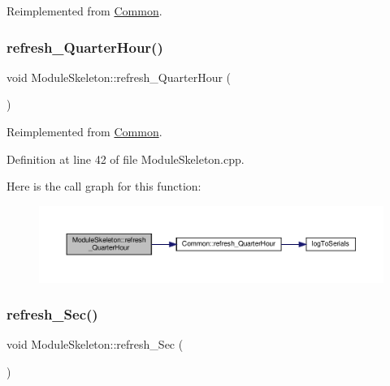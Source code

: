 Reimplemented from \hyperlink{class_common_aa7222229739c89d441fadd6a40deff89}{Common}.

\mbox{\label{class_module_skeleton_ade7e1fee2417a8e23a1f8f31502045ab}} 
\subsubsection{\texorpdfstring{refresh\+\_\+\+Quarter\+Hour()}{refresh\_QuarterHour()}\hspace{0.1cm}{\footnotesize\ttfamily [2/2]}}
{\footnotesize\ttfamily void Module\+Skeleton\+::refresh\+\_\+\+Quarter\+Hour (\begin{DoxyParamCaption}{ }\end{DoxyParamCaption})\hspace{0.3cm}{\ttfamily [virtual]}}



Reimplemented from \hyperlink{class_common_aa7222229739c89d441fadd6a40deff89}{Common}.



Definition at line 42 of file Module\+Skeleton.\+cpp.

Here is the call graph for this function\+:
\nopagebreak
\begin{figure}[H]
\begin{center}
\leavevmode
\includegraphics[width=350pt]{class_module_skeleton_ade7e1fee2417a8e23a1f8f31502045ab_cgraph}
\end{center}
\end{figure}
\mbox{\label{class_module_skeleton_ae9b2578a2c1ecb343cd7b3b21320145e}} 
\subsubsection{\texorpdfstring{refresh\+\_\+\+Sec()}{refresh\_Sec()}\hspace{0.1cm}{\footnotesize\ttfamily [1/2]}}
{\footnotesize\ttfamily void Module\+Skeleton\+::refresh\+\_\+\+Sec (\begin{DoxyParamCaption}{ }\end{DoxyParamCaption})\hspace{0.3cm}{\ttfamily [virtual]}}



